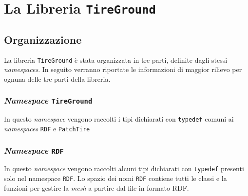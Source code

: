 \chapter{La Libreria \texttt{TireGround}}
\label{Codice}
%
\section{Organizzazione}
La libreria \texttt{TireGround} è stata organizzata in tre parti, definite dagli stessi \textit{namespaces}. In seguito verranno riportate le informazioni di maggior rilievo per ognuna delle tre parti della libreria.
%
\subsection{\textit{Namespace} \texttt{TireGround}}
In questo \textit{namespace} vengono raccolti i tipi dichiarati con \texttt{typedef} comuni ai \textit{namespaces} \texttt{RDF} e \texttt{PatchTire}
%
\subsection{\textit{Namespace} \texttt{RDF}} 
In questo \textit{namespace} vengono raccolti alcuni tipi dichiarati con \texttt{typedef} presenti solo nel namespace \texttt{RDF}. Lo spazio dei nomi \texttt{RDF} contiene tutti le classi e la funzioni per gestire la \textit{mesh} a partire dal file in formato \ac{RDF}.
%
